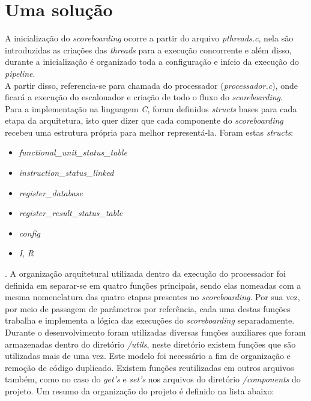 \documentclass[journal]{IEEEtran}
\begin{document}
\section{Uma solução}
A inicialização do \textit{scoreboarding} ocorre a partir do arquivo \textit{pthreads.c}, nela são introduzidas as criações das \textit{threads} para a execução concorrente e além disso, durante a inicialização é organizado toda a configuração e início da execução do \textit{pipeline}.\\
A partir disso, referencia-se para chamada do processador (\textit{processador.c}), onde ficará a execução do escalonador e criação de todo o fluxo do \textit{scoreboarding}.\\
Para a implementação na linguagem \textit{C}, foram definidos \textit{structs} bases para cada etapa da arquitetura, isto quer dizer que cada componente do \textit{scoreboarding} recebeu uma estrutura própria para melhor representá-la. Foram estas \textit{structs}:
\begin{itemize}
    \item \textit{functional\_unit\_status\_table}
    \item \textit{instruction\_status\_linked}  
    \item \textit{register\_database}
    \item \textit{register\_result\_status\_table}
    \item \textit{config}
    \item \textit{I}, \textit{R}  
\end{itemize}.
A organização arquitetural utilizada dentro da execução do processador foi definida em separar-se em quatro funções principais, sendo elas nomeadas com a mesma nomenclatura das quatro etapas presentes no \textit{scoreboarding}. Por sua vez, por meio de passagem de parâmetros por referência, cada uma destas funções trabalha e implementa a lógica das execuções do \textit{scoreboarding} separadamente.
Durante o desenvolvimento foram utilizadas diversas funções auxiliares que foram armazenadas dentro do diretório \textit{/utils}, neste diretório existem funções que são utilizadas mais de uma vez. Este modelo foi necessário a fim de organização e remoção de código duplicado. Existem funções reutilizadas em outros arquivos também, como no caso do \textit{get's} e \textit{set's} nos arquivos do diretório \textit{/components} do projeto.
Um resumo da organização do projeto é definido na lista abaixo:
\end{document}
